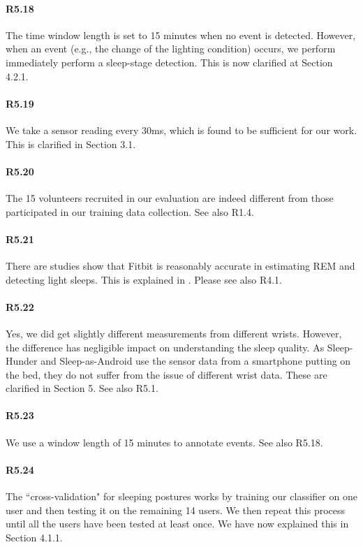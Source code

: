 \paragraph{R5.18} The time window length is set to 15 minutes when no event is detected. However, when an event (e.g., the change of the
lighting condition) occurs, we perform immediately perform a sleep-stage detection. This is now clarified at Section 4.2.1.

\paragraph{R5.19} We take a sensor reading every 30ms, which is found to be sufficient for our work. This is clarified in Section 3.1.

\paragraph{R5.20} The 15 volunteers recruited in our evaluation are indeed different from those participated in our training data collection. See also R1.4.

\paragraph{R5.21} There are studies show that Fitbit is reasonably accurate in estimating REM and detecting light sleeps. This is explained in .
Please see also R4.1.

\paragraph{R5.22} Yes, we did get slightly different measurements from different wrists. However, the difference has negligible impact on
understanding the sleep quality. As Sleep-Hunder and Sleep-as-Android use the sensor data from a smartphone putting on the bed, they do not
suffer from the issue of different wrist data. These are clarified in Section 5. See also R5.1.


\paragraph{R5.23} We use a window length of 15 minutes to annotate events. See also R5.18.

\paragraph{R5.24} The ``cross-validation" for sleeping postures works by training our classifier on one user and then testing it on the
remaining 14 users. We then repeat this process until all the users have been tested at least once. We have now explained this in Section
4.1.1.


